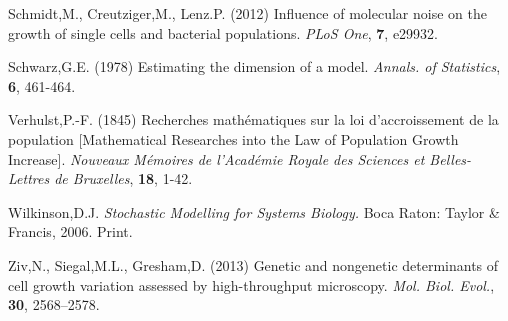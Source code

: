 \documentclass{bioinfo}
\begin{document}
\begin{thebibliography}{}
 Schmidt,M., Creutziger,M., Lenz.P. (2012) Influence of molecular noise on the growth of single cells and bacterial populations. {\it PLoS One}, {\bf 7}, e29932. 

 Schwarz,G.E. (1978) Estimating the dimension of a model. {\it Annals. of Statistics}, {\bf 6}, 461-464. 

 Verhulst,P.-F. (1845) Recherches mathématiques sur la loi d'accroissement de la population [Mathematical Researches into the Law of Population Growth Increase]. {\it Nouveaux Mémoires de l'Académie Royale des Sciences et Belles-Lettres de Bruxelles}, {\bf 18}, 1-42.

 Wilkinson,D.J. {\it Stochastic Modelling for Systems Biology.} Boca Raton: Taylor \& Francis, 2006. Print. 

 Ziv,N., Siegal,M.L., Gresham,D. (2013) Genetic and nongenetic determinants of cell growth variation assessed by high-throughput microscopy. {\it Mol. Biol. Evol.}, {\bf 30}, 2568–2578. 

\end{thebibliography}
\end{document}
